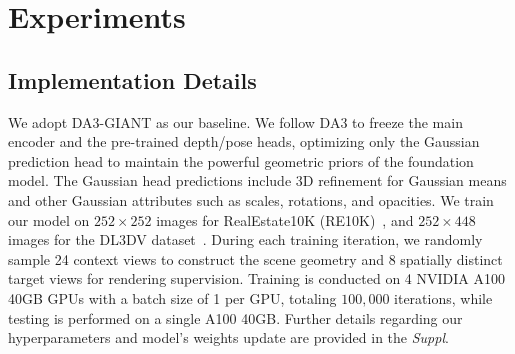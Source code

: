 \section{Experiments}
\label{sec:experiments}

\subsection{Implementation Details}

We adopt DA3-GIANT \cite{lin2025da3} as our baseline. We follow DA3 to freeze the main encoder and the pre-trained depth/pose heads, optimizing only the Gaussian prediction head to maintain the powerful geometric priors of the foundation model. 
The Gaussian head predictions include 3D refinement for Gaussian means and other Gaussian attributes such as scales, rotations, and opacities. 
We train our model on $252 \times 252$ images for RealEstate10K (RE10K)~\cite{zhou2018stereo}, and $252 \times 448$ images for the DL3DV dataset~\cite{ling2024dl3dv}.
During each training iteration, we randomly sample 24 context views to construct the scene geometry and 8 spatially distinct target views for rendering supervision.
Training is conducted on 4 NVIDIA A100 40GB GPUs with a batch size of 1 per GPU, totaling $100,000$ iterations, while testing is performed on a single A100 40GB. Further details regarding our hyperparameters and model's weights update are provided in the \textit{Suppl}. 






